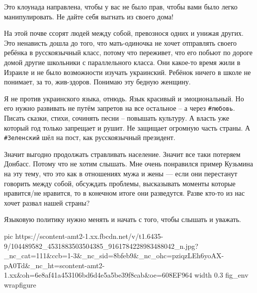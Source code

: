 Это клоунада направлена, чтобы у вас не было прав, чтобы вами было легко
манипулировать. Не дайте себя выгнать из своего дома!

На этой почве ссорят людей между собой, превознося одних и унижая других. Это
ненависть дошла до того, что мать-одиночка не хочет отправлять своего ребёнка в
русскоязычный класс, потому что переживет, что его побьют по дороге домой
другие школьники с параллельного класса. Они какое-то время жили в Израиле и не
было возможности изучать украинский. Ребёнок ничего в школе не понимает, за то,
жив-здоров. Понимаю эту бедную женщину.

Я не против украинского языка, отнюдь. Язык красивый и эмоциональный. Но его
нужно развивать не путём запретов на все остальное – а через \verb|#любовь|. Писать
сказки, стихи, сочинять песни – повышать культуру. А власть уже который год
только запрещает и рушит. Не защищает огромную часть страны. А \verb|#Зеленский| шёл
на пост, как русскоязычный президент.

Значит выгодно продолжать стравливать население. Значит все таки потеряем
Донбасс. Потому что не хотим слышать. Мне очень понравился пример Кузьмина на
эту тему, что это как в отношениях мужа и жены — если они перестанут говорить
между собой, обсуждать проблемы, высказывать моменты которые нравится/не
нравится, то в конечном итоге они разведутся. Разве кто-то из нас хочет развал
нашей страны?

Языковую политику нужно менять и начать с того, чтобы слышать и уважать.

\ifcmt
  pic https://scontent-amt2-1.xx.fbcdn.net/v/t1.6435-9/104489582_4531883503504385_9161784228983488042_n.jpg?_nc_cat=111&ccb=1-3&_nc_sid=8bfeb9&_nc_ohc=pziqzLEh6yoAX-pA0Td&_nc_ht=scontent-amt2-1.xx&oh=6e8af41a453106bd6d4e5a5be39f8cab&oe=608EF964
  width 0.3
  fig_env wrapfigure
\fi


